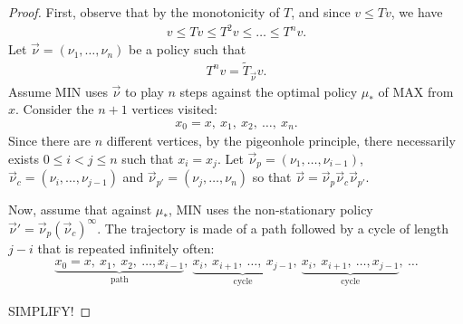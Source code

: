 \documentclass{article}
\begin{document}
\begin{proof}
  First, observe that by the monotonicity of $T$, and since $v \le Tv$, we have
  \begin{align}
    v \le Tv \le T^2 v \le \dots \le T^n v.
  \end{align}
  Let $\vec\nu=(\nu_1,\dots,\nu_n)$ be a policy such that
  \begin{align}
    T^n v = \tilde T_{\vec\nu} v.
  \end{align}
  Assume MIN uses $\vec\nu$ to play $n$ steps against the optimal policy $\mu_*$ of MAX from $x$. Consider the $n+1$ vertices visited:
  \begin{align}
    x_0=x,~ x_1,~ x_2,~ \dots,~ x_n.
  \end{align}
  Since there are $n$ different vertices, by the pigeonhole principle, there necessarily exists $0 \le i < j \le n$ such that $x_i=x_j$. Let $\vec\nu_p=(\nu_1,\dots,\nu_{i-1})$, $\vec\nu_c=(\nu_i,\dots,\nu_{j-1})$ and $\vec\nu_{p'}=(\nu_j,\dots,\nu_n)$ so that $\vec\nu=\vec\nu_p \vec\nu_c \vec\nu_{p'}$.
  
  Now, assume that against $\mu_*$, MIN uses the non-stationary policy $\vec\nu'=\vec\nu_p(\vec\nu_c)^\infty$. The trajectory is made of a path followed by a cycle of length $j-i$ that is repeated infinitely often:
  \begin{align}
    \underbrace{x_0=x,~ x_1,~ x_2,~ \dots, x_{i-1}}_{\mbox{path}},~ \underbrace{x_i,~ x_{i+1},~ \dots,~ x_{j-1}}_{\mbox{cycle}},~ \underbrace{x_i,~ x_{i+1},~ \dots, x_{j-1}}_{\mbox{cycle}}, ~\dots
  \end{align}

  SIMPLIFY!


\end{proof}
\end{document}
